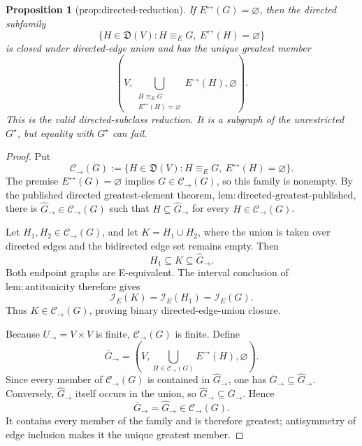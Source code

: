 \documentclass{article}
\newtheorem{proposition}{Proposition}
\begin{document}
\begin{proposition}[prop:directed-reduction]\label{prop:directed-reduction}
If \(E^{\leftrightarrow}(G)=\varnothing\), then the directed subfamily
\[
\{H\in\mathfrak D(V):H\equiv_E G,\ E^{\leftrightarrow}(H)=\varnothing\}
\]
is closed under directed-edge union and has the unique greatest member
\[
\left(V,
\bigcup_{\substack{H\equiv_EG\\E^{\leftrightarrow}(H)=\varnothing}}E^{\to}(H),
\varnothing\right).
\]
This is the valid directed-subclass reduction.  It is a subgraph of the unrestricted \(G^\star\), but equality with \(G^\star\) can fail.
\end{proposition}
\begin{proof}
Put
\[
 \mathcal C_{\to}(G)
 :=\{H\in\mathfrak D(V):H\equiv_EG,\ E^{\leftrightarrow}(H)=\varnothing\}.
\]
The premise \(E^{\leftrightarrow}(G)=\varnothing\) implies \(G\in\mathcal C_{\to}(G)\), so this family is nonempty.  By the published directed greatest-element theorem, \(\mathrm{lem{:}directed\text{-}greatest\text{-}published}\), there is \(\widehat G_{\to}\in\mathcal C_{\to}(G)\) such that \(H\subseteq\widehat G_{\to}\) for every \(H\in\mathcal C_{\to}(G)\).

Let \(H_1,H_2\in\mathcal C_{\to}(G)\), and let \(K=H_1\cup H_2\), where the union is taken over directed edges and the bidirected edge set remains empty.  Then
\[
 H_1\subseteq K\subseteq\widehat G_{\to}.
\]
Both endpoint graphs are E-equivalent.  The interval conclusion of \(\mathrm{lem{:}antitonicity}\) therefore gives
\[
 \mathcal I_E(K)=\mathcal I_E(H_1)=\mathcal I_E(G).
\]
Thus \(K\in\mathcal C_{\to}(G)\), proving binary directed-edge-union closure.

Because \(U_{\to}=V\times V\) is finite, \(\mathcal C_{\to}(G)\) is finite.  Define
\[
 \overline G_{\to}
 =\left(V,
   \bigcup_{H\in\mathcal C_{\to}(G)}E^{\to}(H),
   \varnothing\right).
\]
Since every member of \(\mathcal C_{\to}(G)\) is contained in \(\widehat G_{\to}\), one has \(\overline G_{\to}\subseteq\widehat G_{\to}\).  Conversely, \(\widehat G_{\to}\) itself occurs in the union, so \(\widehat G_{\to}\subseteq\overline G_{\to}\).  Hence
\[
 \overline G_{\to}=\widehat G_{\to}\in\mathcal C_{\to}(G).
\]
It contains every member of the family and is therefore greatest; antisymmetry of edge inclusion makes it the unique greatest member.


\end{proof}
\end{document}

